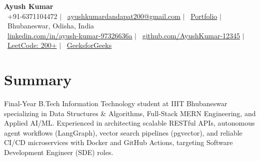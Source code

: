 \documentclass[letterpaper,10pt]{article}
\begin{document}
\begin{center}
    {\Huge \textbf{Ayush Kumar}} \\ \vspace{2pt}
    \small
    \faPhone*\ +91-6371104472 \hspace{0.4em}$|$\hspace{0.4em}
    \faEnvelope\ \href{mailto:ayushkumardandapat200@gmail.com}{ayushkumardandapat200@gmail.com} \hspace{0.4em}$|$\hspace{0.4em}
    \faGlobe\ \href{https://ayush-portfolio-3yan.onrender.com}{Portfolio} \hspace{0.4em}$|$\hspace{0.4em}
    \faMapMarker*\ Bhubaneswar, Odisha, India \\ \vspace{1.5pt}
    \faLinkedin\ \href{https://linkedin.com/in/ayush-kumar-97326636a}{linkedin.com/in/ayush-kumar-97326636a} \hspace{0.4em}$|$\hspace{0.4em}
    \faGithub\ \href{https://github.com/AyushKumar-12345}{github.com/AyushKumar-12345} \hspace{0.4em}$|$\hspace{0.4em}
    \faCode\ \href{https://leetcode.com/u/ayushkumardandapat/}{LeetCode: 200+} \hspace{0.4em}$|$\hspace{0.4em}
    \faLaptopCode\ \href{https://www.geeksforgeeks.org/profile/ayushkumardcypg?from=explore&tab=activity}{GeeksforGeeks}
\end{center}
\vspace{-11pt}

\section{Summary}
\vspace{1pt}
\noindent\small{Final-Year B.Tech Information Technology student at IIIT Bhubaneswar specializing in Data Structures \& Algorithms, Full-Stack MERN Engineering, and Applied AI/ML. Experienced in architecting scalable RESTful APIs, autonomous agent workflows (LangGraph), vector search pipelines (pgvector), and reliable CI/CD microservices with Docker and GitHub Actions, targeting Software Development Engineer (SDE) roles.}

\end{document}
